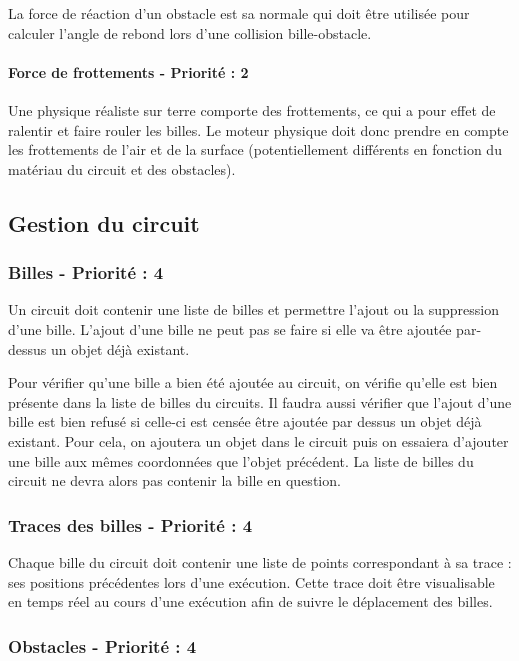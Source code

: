 \documentclass{report}
\begin{document}
La force de réaction d’un obstacle est sa normale qui doit être utilisée pour calculer l’angle de rebond lors d’une collision bille-obstacle. 


\paragraph{Force de frottements - Priorité : 2}

Une physique réaliste sur terre comporte des frottements, ce qui a pour effet de ralentir et faire rouler les billes.  Le moteur physique doit donc prendre en compte les frottements de l’air et de la surface (potentiellement différents en fonction du matériau du circuit et des obstacles).

\subsection{Gestion du circuit}

\subsubsection{Billes - Priorité : 4}

Un circuit doit contenir une liste de billes et permettre l’ajout ou la suppression d’une bille. L’ajout d’une bille ne peut pas se faire si elle va être ajoutée par-dessus un objet déjà existant.

Pour vérifier qu’une bille a bien été ajoutée au circuit, on vérifie qu’elle est bien présente dans la liste de billes du circuits. Il faudra aussi vérifier que l’ajout d’une bille est bien refusé si celle-ci est censée être ajoutée par dessus un objet déjà existant. Pour cela, on ajoutera un objet dans le circuit puis on essaiera d’ajouter une bille aux mêmes coordonnées que l’objet précédent. La liste de billes du circuit ne devra alors pas contenir la bille en question.

\subsubsection{Traces des billes - Priorité : 4}

Chaque bille du circuit doit contenir une liste de points correspondant à sa trace : ses positions précédentes lors d’une exécution. Cette trace doit être visualisable en temps réel au cours d’une exécution afin de suivre le déplacement des billes.


\subsubsection{Obstacles - Priorité : 4}
\end{document}
